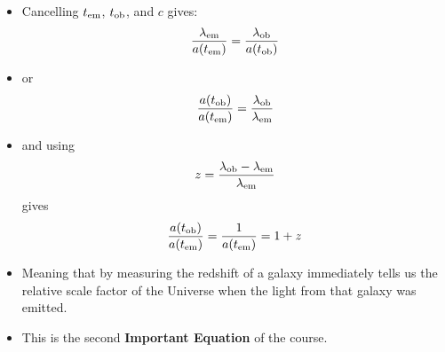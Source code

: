 \documentclass[11pt]{article}
\begin{document}
\begin{itemize}
\item Cancelling $t_{\rm em}$, $t_{\rm ob}$, and $c$ gives:  
\begin{equation}
    \frac{\lambda_{\rm em}}{a(t_{\rm em})} = \frac{\lambda_{\rm ob}}{a(t_{\rm ob})}
\end{equation}
\item or
\begin{equation}
    \frac{a(t_{\rm ob})}{a(t_{\rm em})} = \frac{\lambda_{\rm ob}}{\lambda_{\rm em}}
\end{equation}
\item and using 
\begin{equation}
    z = \frac{\lambda_{\rm ob}-\lambda_{\rm em}}{\lambda_{\rm em}}
\end{equation}
gives
\begin{equation}
    \frac{a(t_{\rm ob})}{a(t_{\rm em})} = \frac{1}{a(t_{\rm em})} = 1+z
\end{equation}
\item Meaning that by measuring the redshift of a galaxy immediately tells us the relative scale factor of the Universe when the light from that galaxy was emitted.
\item This is the second {\bf Important Equation} of the course.
\end{itemize}
\end{document}
